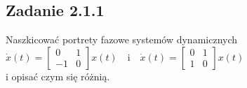 \subsection*{Zadanie 2.1.1} {\color{darkgray}
	Naszkicować portrety fazowe systemów dynamicznych\\
	$\dot{x}(t)=\left[\begin{array}{cc}0&1\\-1&0\end{array}\right]x(t)\ \ \ $ i $\ \ \ \dot{x}(t)=\left[\begin{array}{cc}0&1\\1&0\end{array}\right]x(t)$\\
	i opisać czym się różnią.\\
}\lineh
\\\\
